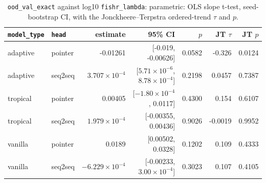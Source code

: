 \documentclass[10pt]{article}
\begin{document}
{\small
\begin{longtable}{llrrrrr}
\caption{\texttt{ood\_val\_exact} against log10 \texttt{fishr\_lambda}: parametric: OLS slope t-test, seed-bootstrap CI, with the Jonckheere--Terpstra ordered-trend $\tau$ and $p$.}\label{tab:trend-ood_val_exact}\\
\toprule
\texttt{model\_type} & \texttt{head} & estimate & 95\% CI & $p$ & JT $\tau$ & JT $p$\\
\midrule
\endhead
adaptive & pointer & -0.01261 & [-0.019, -0.00626] & 0.0582 & -0.326 & 0.0124\\
adaptive & seq2seq & $3.707\times10^{-4}$ & [$5.71\times10^{-6}$, $8.78\times10^{-4}$] & 0.2198 & 0.0457 & 0.7387\\
tropical & pointer & 0.00405 & [$-1.80\times10^{-4}$, 0.0117] & 0.4300 & 0.154 & 0.6107\\
tropical & seq2seq & $1.979\times10^{-4}$ & [-0.00355, 0.00436] & 0.9026 & -0.0019 & 0.9952\\
vanilla & pointer & 0.0189 & [0.00502, 0.0328] & 0.1202 & 0.109 & 0.4333\\
vanilla & seq2seq & $-6.229\times10^{-4}$ & [-0.00233, $3.00\times10^{-4}$] & 0.3023 & 0.107 & 0.4105\\
\bottomrule
\end{longtable}
}
\end{document}
